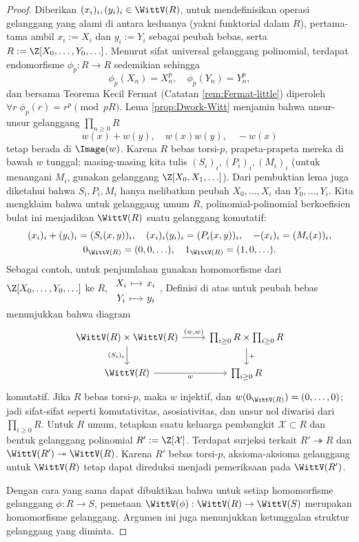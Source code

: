 \begin{proof}
	Diberikan $(x_i)_i, (y_i)_i \in \WittV(R)$, untuk mendefinisikan operasi gelanggang yang alami di antara keduanya (yakni funktorial dalam $R$), pertama-tama ambil $x_i := X_i$ dan $y_i := Y_i$ sebagai peubah bebas, serta $R := \Z[X_0, \ldots, Y_0, \ldots]$. Menurut sifat universal gelanggang polinomial, terdapat endomorfisme $\phi_p: R \to R$ sedemikian sehingga
	\[ \phi_p(X_n) = X_n^p, \quad \phi_p(Y_n) = Y_n^p, \]
	dan bersama Teorema Kecil Fermat (Catatan \ref{rem:Fermat-little}) diperoleh $\forall r \; \phi_p(r) = r^p \pmod{pR}$. Lema \ref{prop:Dwork-Witt} menjamin bahwa unsur-unsur gelanggang $\prod_{n \geq 0} R$
	\[ w(x) + w(y), \quad w(x)w(y), \quad -w(x) \]
	tetap berada di $\Image(w)$. Karena $R$ bebas torsi-$p$, prapeta-prapeta mereka di bawah $w$ tunggal; masing-masing kita tulis $(S_i)_i, (P_i)_i, (M_i)_i$ (untuk menangani $M_i$, gunakan gelanggang $\Z[X_0, X_1, \ldots]$). Dari pembuktian lema juga diketahui bahwa $S_i, P_i, M_i$ hanya melibatkan peubah $X_0, \ldots, X_i$ dan $Y_0, \ldots, Y_i$. Kita mengklaim bahwa untuk gelanggang umum $R$, polinomial-polinomial berkoefisien bulat ini menjadikan $\WittV(R)$ suatu gelanggang komutatif:
	\begin{gather*}
		(x_i)_i + (y_i)_i = (S_i(x,y))_i, \quad (x_i)_i (y_i)_i = (P_i(x,y))_i, \quad  -(x_i)_i = (M_i(x))_i, \\
		0_{\WittV(R)} = (0,0, \ldots), \quad 1_{\WittV(R)} = (1,0,\ldots).
	\end{gather*}
	Sebagai contoh, untuk penjumlahan gunakan homomorfisme dari $\Z[X_0, \ldots, Y_0, \ldots]$ ke $R$,
	$\begin{tikzcd}[row sep=0pt, column sep=small] X_i \arrow[mapsto, r] & x_i \\ Y_i \arrow[mapsto, r] & y_i \end{tikzcd}$,
	Definisi di atas untuk peubah bebas menunjukkan bahwa diagram
	\[\begin{tikzcd}
		\WittV(R) \times \WittV(R) \arrow[d, "{(S_i)_i}"'] \arrow[r, "{(w,w)}"] & \prod_{i \geq 0} R  \times \prod_{i \geq 0} R \arrow[d, "+"] \\
		\WittV(R) \arrow[r, "w"'] & \prod_{i \geq 0} R
	\end{tikzcd}\]
	komutatif. Jika $R$ bebas torsi-$p$, maka $w$ injektif, dan $w(0_{\WittV(R)}) = (0, \ldots, 0)$; jadi sifat-sifat seperti komutativitas, asosiativitas, dan unsur nol diwarisi dari $\prod_{i \geq 0} R$. Untuk $R$ umum, tetapkan suatu keluarga pembangkit $\mathcal{X} \subset R$ dan bentuk gelanggang polinomial $R' := \Z[\mathcal{X}]$. Terdapat surjeksi terkait $R' \twoheadrightarrow R$ dan $\WittV(R') \twoheadrightarrow \WittV(R)$. Karena $R'$ bebas torsi-$p$, aksioma-aksioma gelanggang untuk $\WittV(R)$ tetap dapat direduksi menjadi pemeriksaan pada $\WittV(R')$.

	Dengan cara yang sama dapat dibuktikan bahwa untuk setiap homomorfisme gelanggang $\phi: R \to S$, pemetaan $\WittV(\phi): \WittV(R) \to \WittV(S)$ merupakan homomorfisme gelanggang. Argumen ini juga menunjukkan ketunggalan struktur gelanggang yang diminta.
\end{proof}

